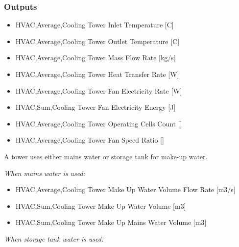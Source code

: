 \subsubsection{Outputs}\label{outputs-2-003}

\begin{itemize}
\item
  HVAC,Average,Cooling Tower Inlet Temperature {[}C{]}
\item
  HVAC,Average,Cooling Tower Outlet Temperature {[}C{]}
\item
  HVAC,Average,Cooling Tower Mass Flow Rate {[}kg/s{]}
\item
  HVAC,Average,Cooling Tower Heat Transfer Rate {[}W{]}
\item
  HVAC,Average,Cooling Tower Fan Electricity Rate {[}W{]}
\item
  HVAC,Sum,Cooling Tower Fan Electricity Energy {[}J{]}
\item
  HVAC,Average,Cooling Tower Operating Cells Count {[]}
\item
  HVAC,Average,Cooling Tower Fan Speed Ratio {[]}
\end{itemize}

A tower uses either mains water or storage tank for make-up water.

\emph{When mains water is used:}

\begin{itemize}
\item
  HVAC,Average,Cooling Tower Make Up Water Volume Flow Rate {[}m3/s{]}
\item
  HVAC,Sum,Cooling Tower Make Up Water Volume {[}m3{]}
\item
  HVAC,Sum,Cooling Tower Make Up Mains Water Volume {[}m3{]}
\end{itemize}

\emph{When storage tank water is used:}

